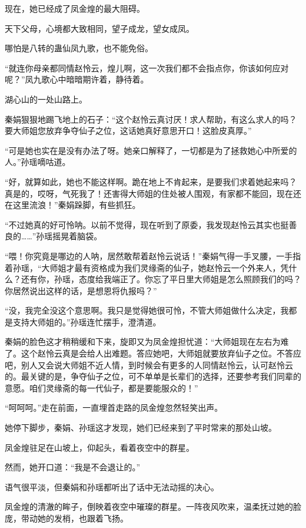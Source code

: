 \begin{this_body}
现在，她已经成了凤金煌的最大阻碍。

天下父母，心境都大致相同，望子成龙，望女成凤。

哪怕是八转的蛊仙凤九歌，也不能免俗。

“就连你母亲都同情赵怜云，煌儿啊，这一次我们都不会指点你，你该如何应对呢？”凤九歌心中暗暗期许着，静待着。

湖心山的一处山路上。

秦娟狠狠地踢飞地上的石子：“这个赵怜云真讨厌！求人帮助，有这么求人的吗？要大师姐您放弃争夺仙子之位，这话她真好意思开口！这脸皮真厚。”

“可是她也实在是没有办法了呀。她亲口解释了，一切都是为了拯救她心中所爱的人。”孙瑶嘀咕道。

“好，就算如此，她也不能这样啊。跪在地上不肯起来，是要我们求着她起来吗？真是的，哎呀，气死我了！还害得大师姐的住处被人围观，有家都不能回，现在还在这里流浪！”秦娟跺脚，有些抓狂。

“不过她真的好可怜呐。以前不觉得，现在听到了原委，我发现赵怜云其实也挺善良的……”孙瑶摇晃着脑袋。

“喂！你究竟是哪边的人呐，居然敢帮着赵怜云说话！”秦娟气得一手叉腰，一手指着孙瑶，“大师姐才最有资格成为我们灵缘斋的仙子，她赵怜云一个外来人，凭什么？还有你，孙瑶，态度给我端正了。你忘了平日里大师姐是怎么照顾我们的吗？你居然说出这样的话，是想恩将仇报吗？”

“没，我完全没这个意思啊。我只是觉得她很可怜，不管大师姐做什么决定，我都是支持大师姐的。”孙瑶连忙摆手，澄清道。

秦娟的脸色这才稍稍缓和下来，旋即又为凤金煌担忧道：“大师姐现在左右为难了。这个赵怜云真是会给人出难题。答应她吧，大师姐就要放弃仙子之位。不答应吧，别人又会说大师姐不近人情，到时候会有更多的人同情赵怜云，认可赵怜云的。最关键的是，争夺仙子之位，可不单单是长辈们的选择，还要参考我们同辈的意愿。咱们灵缘斋的每一代仙子，都是要能服众的！”

“呵呵呵。”走在前面，一直埋首走路的凤金煌忽然轻笑出声。

她停下脚步，秦娟、孙瑶这才发现，她们已经来到了平时常来的那处山坡。

凤金煌驻足在山坡上，仰起头，看着夜空中的群星。

然而，她开口道：“我是不会退让的。”

语气很平淡，但秦娟和孙瑶都听出了话中无法动摇的决心。

凤金煌的清澈的眸子，倒映着夜空中璀璨的群星。一阵夜风吹来，温柔抚过她的脸庞，带动她的发梢，也跟着飞扬。


\end{this_body}
